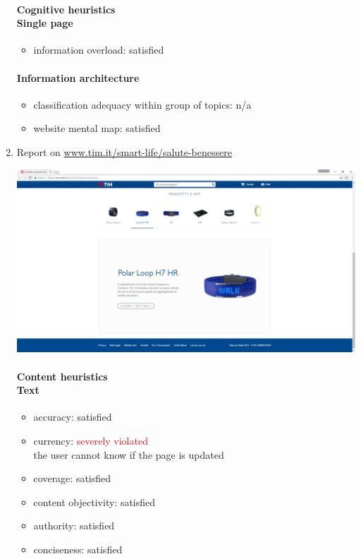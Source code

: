 \begin{enumerate}
	\paragraph*{Cognitive heuristics \\ Single page}
	\begin{itemize}
		\item information overload: satisfied
	\end{itemize}	
	
	\paragraph*{Information architecture}
	\begin{itemize}
		\item classification adequacy within group of topics: n/a
		\item website mental map: satisfied
	\end{itemize}

\newpage


\item Report on \url{www.tim.it/smart-life/salute-benessere}

\begin{center}
	\includegraphics[width=\textwidth]{Screenshot/salute.jpg}
\end{center}
\vspace{1cm}

	\paragraph*{Content heuristics \\ Text}
	\begin{itemize}
		\item accuracy: satisfied
		\item currency: \textcolor{red}{severely violated}\\
		the user cannot know if the page is updated
		\item coverage: satisfied
		\item content objectivity: satisfied
		\item authority: satisfied
		\item conciseness: satisfied		
	\end{itemize}


\end{enumerate}

